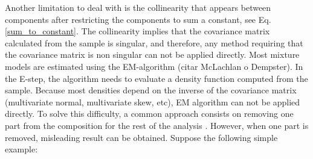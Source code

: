 \documentclass[10pt, a4paper]{article}
\begin{document}
Another limitation to deal with is the collinearity that appears between components  after restricting the components to sum a constant, see Eq. \ref{sum_to_constant}. The collinearity implies that the covariance matrix calculated from the sample is singular, and therefore, any method requiring that the covariance matrix is non singular can not be applied directly. Most mixture models are estimated using the EM-algorithm (citar McLachlan o Dempster). In the E-step, the algorithm needs to evaluate a density function computed from the sample. Because most densities depend on the inverse of the covariance matrix (multivariate normal, multivariate skew, etc), EM algorithm can not be applied directly. To solve this difficulty, a common approach consists on removing one part from the composition for the rest of the analysis \citep{papageorgiou2001model}. However, when one part is removed,  misleading result can be obtained. Suppose the following simple example: 
\end{document}
